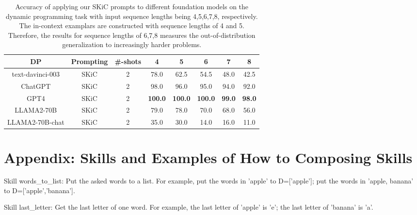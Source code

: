 \documentclass{article} \usepackage{arxiv}
\begin{document}
\begin{table}[ht]
\caption{Accuracy of applying our SKiC prompts to different foundation models on the dynamic programming task with input sequence lengths being 4,5,6,7,8, respectively. The in-context examplars are constructed with sequence lengths of 4 and 5. Therefore, the results for sequence lengths of 6,7,8 measures the out-of-distribution generalization to increasingly harder problems.} \label{Tab:dp_results_llama2}
\centering
\begin{tabular}{c|c|c|cc|ccc} \toprule
\textbf{DP}               & \textbf{Prompting}&\textbf{\#-shots} & \multicolumn{1}{c}{\textbf{4}} & \textbf{5}  & \textbf{6}  & \textbf{7}  & \textbf{8}  \\ \midrule\midrule 

\multirow{1}{*}{text-davinci-003}
                          & SKiC   &2             & 78.0                    & 62.5 & 54.5 & 48.0 &42.5 \\ 
\multirow{1}{*}{ChatGPT} 
                          & SKiC    &2            & 98.0                    & 96.0 & 95.0 & 94.0 & 92.0 \\ 
\multirow{1}{*}{GPT4}    
                          & SKiC  &2             & \textbf{100.0}                    & \textbf{100.0} & \textbf{100.0} & \textbf{99.0} & \textbf{98.0} \\ \midrule

\multirow{1}{*}{LLAMA2-70B}
                          & SKiC   &2             & 79.0                    & 78.0 & 70.0 & 68.0 &56.0 \\ 
\multirow{1}{*}{LLAMA2-70B-chat}
                          & SKiC   &2             & 35.0                    & 30.0 & 14.0 & 16.0 &11.0 \\  \bottomrule
\end{tabular} 
\end{table}



\newpage


\section{Appendix: Skills and Examples of How to Composing Skills}



\begin{tcolorbox}[title = {Skills for Last Letter Concatenation}, colback = Apricot!25!white, colframe = BrickRed!75!black] 
Skill words\_to\_list: Put the asked words to a list.  For example, put the words in 'apple' to D=['apple']; put the words in 'apple, banana' to  D=['apple','banana']. 

\quad

Skill last\_letter: Get the last letter of one word.  For example, the last letter of 'apple' is 'e'; the last letter of 'banana' is 'a'.
\end{tcolorbox}
\noindent\begin{minipage}{\textwidth}
 \label{Tab:last_letter_skill}
\end{minipage}
\end{document}
